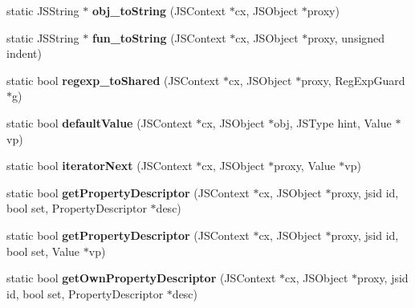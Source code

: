 \begin{DoxyCompactItemize}
\item 
\hypertarget{classjs_1_1_proxy_ac49074324d9fbfb601125b8f7173351c}{static J\-S\-String $\ast$ {\bfseries obj\-\_\-to\-String} (J\-S\-Context $\ast$cx, J\-S\-Object $\ast$proxy)}\label{classjs_1_1_proxy_ac49074324d9fbfb601125b8f7173351c}

\item 
\hypertarget{classjs_1_1_proxy_a3ced4a051310fb50483388cb55c84591}{static J\-S\-String $\ast$ {\bfseries fun\-\_\-to\-String} (J\-S\-Context $\ast$cx, J\-S\-Object $\ast$proxy, unsigned indent)}\label{classjs_1_1_proxy_a3ced4a051310fb50483388cb55c84591}

\item 
\hypertarget{classjs_1_1_proxy_a9bcc8b353be22db95c1b7866a2d619f1}{static bool {\bfseries regexp\-\_\-to\-Shared} (J\-S\-Context $\ast$cx, J\-S\-Object $\ast$proxy, Reg\-Exp\-Guard $\ast$g)}\label{classjs_1_1_proxy_a9bcc8b353be22db95c1b7866a2d619f1}

\item 
\hypertarget{classjs_1_1_proxy_aa3f353388fd32348e9b462c2defdfe12}{static bool {\bfseries default\-Value} (J\-S\-Context $\ast$cx, J\-S\-Object $\ast$obj, J\-S\-Type hint, Value $\ast$vp)}\label{classjs_1_1_proxy_aa3f353388fd32348e9b462c2defdfe12}

\item 
\hypertarget{classjs_1_1_proxy_a336025d671285655c72e51a1f2aea4da}{static bool {\bfseries iterator\-Next} (J\-S\-Context $\ast$cx, J\-S\-Object $\ast$proxy, Value $\ast$vp)}\label{classjs_1_1_proxy_a336025d671285655c72e51a1f2aea4da}

\item 
\hypertarget{classjs_1_1_proxy_aee8491e10a3ee9bd2fa47fc351f0bb33}{static bool {\bfseries get\-Property\-Descriptor} (J\-S\-Context $\ast$cx, J\-S\-Object $\ast$proxy, jsid id, bool set, Property\-Descriptor $\ast$desc)}\label{classjs_1_1_proxy_aee8491e10a3ee9bd2fa47fc351f0bb33}

\item 
\hypertarget{classjs_1_1_proxy_a15fcecf3397c5135fc502822c99232e0}{static bool {\bfseries get\-Property\-Descriptor} (J\-S\-Context $\ast$cx, J\-S\-Object $\ast$proxy, jsid id, bool set, Value $\ast$vp)}\label{classjs_1_1_proxy_a15fcecf3397c5135fc502822c99232e0}

\item 
\hypertarget{classjs_1_1_proxy_a3a9d3c7487c3c487afa4eb3c6b1d0a36}{static bool {\bfseries get\-Own\-Property\-Descriptor} (J\-S\-Context $\ast$cx, J\-S\-Object $\ast$proxy, jsid id, bool set, Property\-Descriptor $\ast$desc)}\label{classjs_1_1_proxy_a3a9d3c7487c3c487afa4eb3c6b1d0a36}


\end{DoxyCompactItemize}
